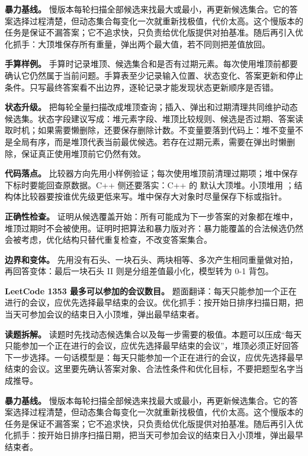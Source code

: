 \textbf{暴力基线。} 慢版本每轮扫描全部候选来找最大或最小，再更新候选集合。它的答案选择过程清楚，但动态集合每变化一次就重新找极值，代价太高。这个慢版本的任务是保证不漏答案；它不追求快，只负责给优化版提供对拍基准。随后再引入优化抓手：大顶堆保存所有重量，弹出两个最大值，若不同则把差值放回。

\textbf{手算样例。} 手算时记录堆顶、候选集合和是否有过期元素。每次使用堆顶前都要确认它仍然属于当前问题。手算表至少记录输入位置、状态变化、答案更新和停止条件。只写最终答案看不出边界，逐轮记录才能发现状态更新顺序是否错。

\textbf{状态升级。} 把每轮全量扫描改成堆顶查询；插入、弹出和过期清理共同维护动态候选集。状态字段建议写成：堆元素字段、堆顶比较规则、候选是否过期、答案读取时机；如果需要懒删除，还要保存删除计数。不变量要落到代码上：堆不变量不是全局有序，而是堆顶代表当前最优候选。若存在过期元素，需要在弹出时懒删除，保证真正使用堆顶前它仍然有效。

\textbf{代码落点。} 比较器方向先用小样例验证；每次使用堆顶前清理过期项；堆中保存下标时要能回查原数据。C++ 侧还要落实：C++ 的  默认大顶堆。小顶堆用 ；结构体比较器要按谁优先级更低来写。堆中保存大对象时尽量保存下标或指针。

\textbf{正确性检查。} 证明从候选覆盖开始：所有可能成为下一步答案的对象都在堆中，堆顶过期时不会被使用。证明时把算法和暴力版对齐：暴力能覆盖的合法候选仍然会被考虑，优化结构只替代重复检查，不改变答案集合。

\textbf{边界和变体。} 先用没有石头、一块石头、两块相等、多次产生相同重量做对拍，再回答变体：最后一块石头 II 则是分组差值最小化，模型转为 0-1 背包。

\noindent\textbf{LeetCode 1353 最多可以参加的会议数目。} 题面翻译：每天只能参加一个正在进行的会议，应优先选择最早结束的会议。优化抓手：按开始日排序扫描日期，把当天可参加会议的结束日入小顶堆，弹出最早结束者。

\textbf{读题拆解。} 读题时先找动态候选集合以及每一步需要的极值。本题可以压成“每天只能参加一个正在进行的会议，应优先选择最早结束的会议”，堆顶必须正好回答下一步选择。一句话模型是：每天只能参加一个正在进行的会议，应优先选择最早结束的会议。这里要先确认答案对象、合法性条件和优化目标，不要把题型名字当成推导。

\textbf{暴力基线。} 慢版本每轮扫描全部候选来找最大或最小，再更新候选集合。它的答案选择过程清楚，但动态集合每变化一次就重新找极值，代价太高。这个慢版本的任务是保证不漏答案；它不追求快，只负责给优化版提供对拍基准。随后再引入优化抓手：按开始日排序扫描日期，把当天可参加会议的结束日入小顶堆，弹出最早结束者。

